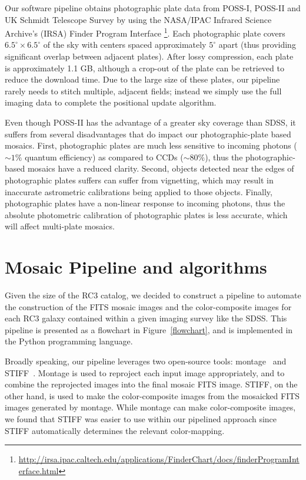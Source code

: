 \documentclass[authoryear, 12pt, 5p, times]{elsarticle}
\begin{document}
Our software pipeline obtains photographic plate data from POSS-I, POSS-II and UK Schmidt Telescope Survey by using the NASA/IPAC Infrared Science Archive's (IRSA) Finder Program Interface \footnote{\url{http://irsa.ipac.caltech.edu/applications/FinderChart/docs/finderProgramInterface.html}}. Each photographic plate covers $6.5^{\circ} \times 6.5^{\circ}$ of the sky with centers spaced approximately $5^{\circ}$ apart (thus providing significant overlap between adjacent plates). After lossy compression, each plate is approximately 1.1 GB, although a crop-out of the plate can be retrieved to reduce the download time. Due to the large size of these plates, our pipeline rarely needs to stitch multiple, adjacent fields; instead we simply use the full imaging data to complete the positional update algorithm.

Even though POSS-II has the advantage of a greater sky coverage than SDSS, it suffers from several disadvantages that do impact our photographic-plate based mosaics. First, photographic plates are much less sensitive to incoming photons ($\sim1\%$ quantum efficiency) as compared to CCDs ($\sim80\%$), thus the photographic-based mosaics have a reduced clarity. Second, objects detected near the edges of photographic plates suffers can suffer from vignetting, which may result in inaccurate astrometric calibrations being applied to those objects. Finally, photographic plates have a non-linear response to incoming photons, thus the absolute photometric calibration of photographic plates is less accurate, which will affect multi-plate mosaics.

\section{Mosaic Pipeline and algorithms\label{mosaic-sec}}
Given the size of the RC3 catalog, we decided to construct a pipeline to automate the construction of the FITS mosaic images and the color-composite images for each RC3 galaxy contained within a given imaging survey like the SDSS. This pipeline is presented as a flowchart in Figure~\ref{flowchart}, and is implemented in the Python programming language.

Broadly speaking, our pipeline leverages two open-source tools: montage~\citep{montage} and  STIFF~\citep{stiff}. Montage is used to reproject each input image appropriately, and to combine the reprojected images into the final mosaic FITS image. STIFF, on the other hand, is used to make the color-composite images from the mosaicked FITS images generated by montage. While montage can make color-composite images, we found that STIFF was easier to use within our pipelined approach since STIFF automatically determines the relevant color-mapping.
\end{document}
